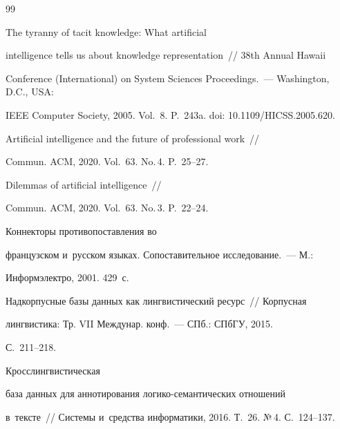 {\small\frenchspacing


{%




\begin{thebibliography}{99}







 The tyranny of tacit knowledge: What artificial 


intelligence tells us about knowledge representation~/\!\!/ 38th Annual Hawaii 


Conference (International) on System Sciences Proceedings.~--- Washington, D.C., USA: 


IEEE Computer Society, 2005. Vol.~8. P.~243a. doi: 10.1109\!/\!HICSS.2005.620.




 Artificial intelligence and the future of professional work~/\!\!/ 


Commun. ACM, 2020. Vol.~63. No.\,4. P.~25--27.




 Dilemmas of artificial intelligence~/\!\!/ 


Commun. ACM, 2020. Vol.~63. No.\,3. P.~22--24.




 Коннекторы противопоставления во 


французском и~русском языках. Сопоставительное исследование.~--- М.: 


Информэлектро, 2001. 429~с.






Надкорпусные базы данных как лингвистический ресурс~/\!\!/ Корпусная 


лингвистика: Тр. VII Междунар. конф.~--- СПб.: СПбГУ, 2015.  


С.~211--218.




 Кросслингвистическая 


база данных для аннотирования логико-семантических отношений 


в~тексте~/\!\!/ Системы и~средства информатики, 2016. Т.~26. №\,4. С.~124--137.



\end{thebibliography}}}
